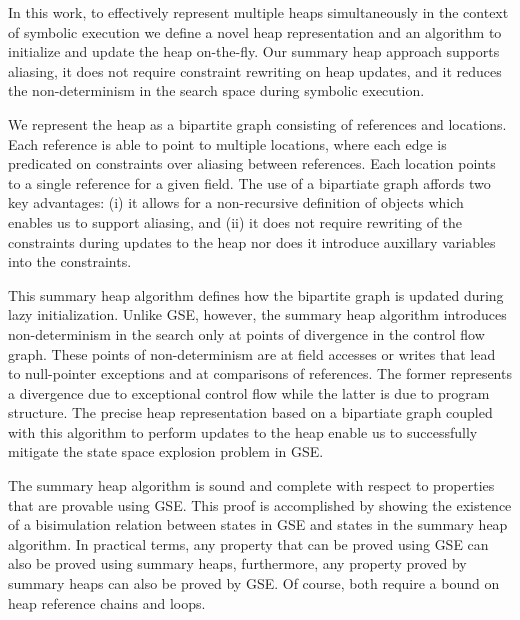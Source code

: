 
In this work, to effectively represent multiple heaps simultaneously
in the context of symbolic execution we define a novel heap
representation and an algorithm to initialize and update the heap
on-the-fly. Our summary heap approach supports aliasing, it does not
require constraint rewriting on heap updates, and it reduces the
non-determinism in the search space during symbolic execution.


We represent the heap as a bipartite graph consisting of references
and locations. Each reference is able to point to multiple locations,
where each edge is predicated on constraints over aliasing between
references. Each location points to a single reference for a given
field. The use of a bipartiate graph affords two key advantages: (i)
it allows for a non-recursive definition of objects which enables us
to support aliasing, and (ii) it does not require rewriting of the
constraints during updates to the heap nor does it introduce auxillary
variables into the constraints.

This summary heap algorithm defines how the bipartite graph is updated
during lazy initialization. Unlike GSE, however, the summary heap
algorithm introduces non-determinism in the search only at points of
divergence in the control flow graph. These points of non-determinism
are at field accesses or writes that lead to null-pointer exceptions
and at comparisons of references. The former represents a divergence
due to exceptional control flow while the latter is due to program
structure. The precise heap representation based on a bipartiate graph
coupled with this algorithm to perform updates to the heap enable us
to successfully mitigate the state space explosion problem in GSE.

The summary heap algorithm is sound and complete with
respect to properties that are provable using GSE. This proof is
accomplished by showing the existence of a bisimulation relation
between states in GSE and states in the summary heap algorithm. In
practical terms, any property that can be proved using GSE can also be
proved using summary heaps, furthermore, any property proved by
summary heaps can also be proved by GSE. Of course, both require a
bound on heap reference chains and loops.

